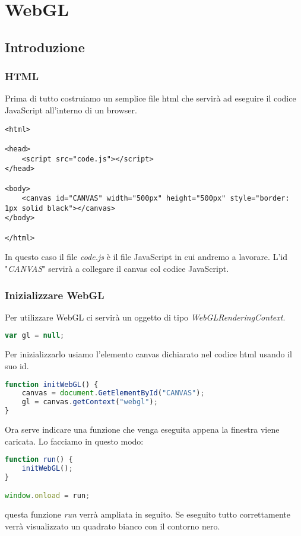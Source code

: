 
\chapter{WebGL}
\section{Introduzione}
\subsection{HTML}
Prima di tutto costruiamo un semplice file html che servir\`a ad eseguire il codice JavaScript
all'interno di un browser.
\begin{lstlisting}[language=html5]
<html>

<head>
	<script src="code.js"></script>
</head>

<body>
	<canvas id="CANVAS" width="500px" height="500px" style="border: 1px solid black"></canvas>
</body>

</html>
\end{lstlisting}
In questo caso il file \emph{code.js} \`e il file JavaScript in cui andremo a lavorare.
L'id "\emph{CANVAS}" servir\`a a collegare il canvas col codice JavaScript.

\subsection{Inizializzare WebGL}
Per utilizzare WebGL ci servir\`a un oggetto di tipo \emph{WebGLRenderingContext}.
\begin{lstlisting}[language=javascript]
var gl = null;
\end{lstlisting}
Per inizializzarlo usiamo l'elemento canvas dichiarato nel codice html usando il suo id.
\begin{lstlisting}[language=javascript, firstnumber=2]
function initWebGL() {
	canvas = document.GetElementById("CANVAS");
	gl = canvas.getContext("webgl");
}
\end{lstlisting}
Ora serve indicare una funzione che venga eseguita appena la finestra viene caricata. Lo
facciamo in questo modo:
\begin{lstlisting}[language=javascript, firstnumber=6]
function run() {
	initWebGL();
}

window.onload = run;
\end{lstlisting}
questa funzione \emph{run} verr\`a ampliata in seguito.
Se eseguito tutto correttamente verr\`a visualizzato un quadrato bianco con il contorno nero.

